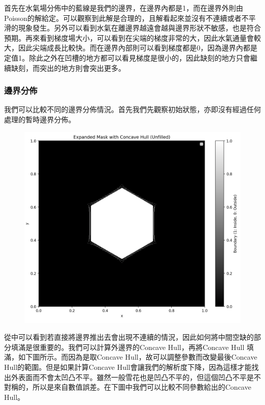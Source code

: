 \documentclass[12pt, a4paper]{article}
\theoremstyle{mystyle}	%
\begin{document}
首先在水氣場分佈中的藍線是我們的邊界，在邊界內都是1，而在邊界外則由Poisson的解給定。可以觀察到此解是合理的，且解看起來並沒有不連續或者不平滑的現象發生。另外可以看到水氣在離邊界越遠會越與邊界形狀不敏感，也是符合預期。再來看到梯度場大小，可以看到在尖端的梯度非常的大，因此水氣通量會較大，因此尖端成長比較快。而在邊界內部則可以看到梯度都是0，因為邊界內都是定值1。除此之外在凹槽的地方都可以看見梯度是很小的，因此缺刻的地方只會繼續缺刻，而突出的地方則會突出更多。
\subsubsection{邊界分佈}
我們可以比較不同的邊界分佈情況。首先我們先觀察初始狀態，亦即沒有經過任何處理的暫時邊界分佈。
\begin{figure}[H]
    \centering
    \includegraphics[width = 8 cm]{bad_boundary.png}
\end{figure}
從中可以看到若直接將邊界推出去會出現不連續的情況，因此如何將中間空缺的部分填滿是很重要的。我們可以計算外邊界的Concave Hull，再將Concave Hull 填滿，如下圖所示。而因為是取Concave Hull，故可以調整參數而改變最後Concave Hull的範圍。但是如果計算Concave Hull會讓我們的解析度下降，因為這樣才能找出外表面而不會太凹凸不平。雖然一般雪花也是凹凸不平的，但這個凹凸不平是不對稱的，所以是來自數值誤差。在下圖中我們可以比較不同參數給出的Concave Hull。
\end{document}
